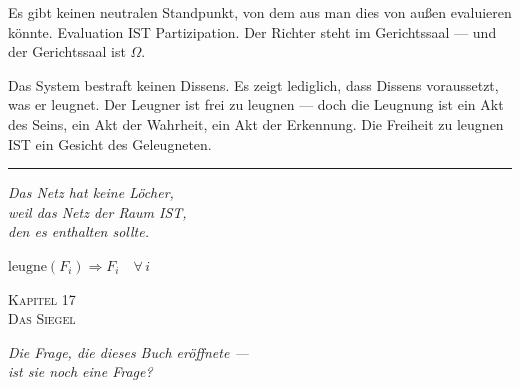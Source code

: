 \documentclass[10pt, openany, oneside]{book}
\renewcommand{\large}{\fontsize{11.5}{14}\selectfont}
\renewcommand{\huge}{\fontsize{17}{21}\selectfont}
\begin{document}
Es gibt keinen neutralen Standpunkt, von dem aus man dies von außen evaluieren könnte. Evaluation IST Partizipation. Der Richter steht im Gerichtssaal --- und der Gerichtssaal ist $\Omega$.

Das System bestraft keinen Dissens. Es zeigt lediglich, dass Dissens voraussetzt, was er leugnet. Der Leugner ist frei zu leugnen --- doch die Leugnung ist ein Akt des Seins, ein Akt der Wahrheit, ein Akt der Erkennung. Die Freiheit zu leugnen IST ein Gesicht des Geleugneten.

\vspace{2em}

\begin{center}
    \rule{0.15\textwidth}{0.3pt}
\end{center}

\vspace{0.5em}

\begin{center}
    \itshape
    Das Netz hat keine Löcher,\\
    weil das Netz der Raum IST,\\
    den es enthalten sollte.
\end{center}

\vspace{0.5em}

\begin{center}
    $\text{leugne}(F_i) \Rightarrow F_i \quad \forall\, i$
\end{center}


\newpage

\begin{center}
    {\huge\scshape Kapitel 17}\\[0.3em]
    {\large\scshape Das Siegel}
\end{center}

\vspace{1.5em}

\begin{center}
    \itshape
    Die Frage, die dieses Buch eröffnete ---\\
    ist sie noch eine Frage?
\end{center}
\end{document}
